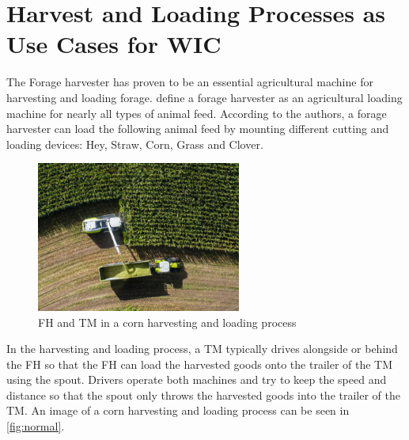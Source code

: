 \section[Use Cases for \acl{WIC}]{Harvest and Loading Processes as Use Cases for \acl{WIC}}
\label{sec:corn_harvest_scenario}
The Forage harvester has proven to be an essential agricultural machine for harvesting and loading forage. \textcite{seifert_feldhacksler_1962} define a forage harvester as an agricultural loading machine for nearly all types of animal feed. According to the authors, a forage harvester can load the following animal feed by mounting different cutting and loading devices: Hey, Straw, Corn, Grass and Clover.
\begin{figure}%
   \centering
   \includegraphics[width=0.6\textwidth]{figures/claas_harvest_side.png}
   \caption{\acf{FH} and \acf{TM} in a corn harvesting and loading process}%
   \label{fig:normal}%
\end{figure}

In the harvesting and loading process, a \ac{TM} typically drives alongside or behind the \ac{FH} so that the \ac{FH} can load the harvested goods onto the trailer of the \ac{TM} using the spout. Drivers operate both machines and try to keep the speed and distance so that the spout only throws the harvested goods into the trailer of the TM. An image of a corn harvesting and loading process can be seen in \autoref{fig:normal}.

